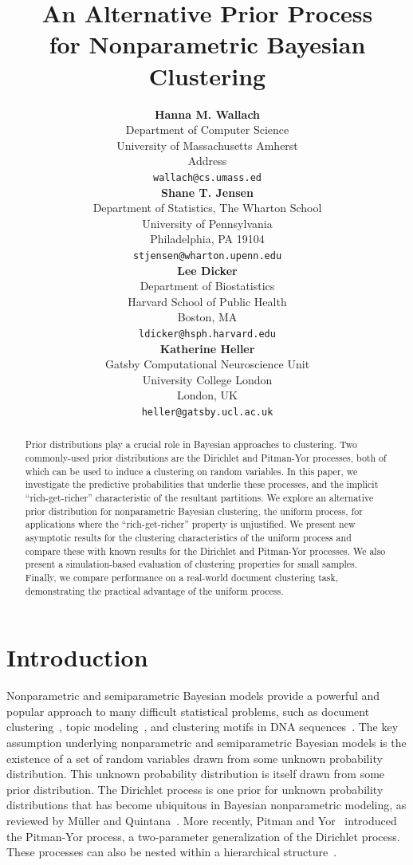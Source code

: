 \documentclass{article}
\title{An Alternative Prior Process\\
for Nonparametric Bayesian Clustering}
\author{
{\bf Hanna M. Wallach}\\
Department of Computer Science \\
University of Massachusetts Amherst \\
Address \\
\texttt{wallach@cs.umass.ed} \\
\And
{\bf Shane T. Jensen}\\
Department of Statistics, The Wharton School\\
University of Pennsylvania\\
Philadelphia, PA 19104 \\
\texttt{stjensen@wharton.upenn.edu} \\
\AND
{\bf Lee Dicker} \\
Department of Biostatistics\\
Harvard School of Public Health\\
Boston, MA \\
\texttt{ldicker@hsph.harvard.edu} \\
\And
{\bf Katherine Heller} \\
Gatsby Computational Neuroscience Unit \\
University College London \\
London, UK \\
\texttt{heller@gatsby.ucl.ac.uk} \\
}
\begin{document}
\makeanontitle

\begin{abstract}
Prior distributions play a crucial role in Bayesian approaches to
clustering.  Two commonly-used prior distributions are the Dirichlet
and Pitman-Yor processes, both of which can be used to induce a
clustering on random variables. In this paper, we investigate the
predictive probabilities that underlie these processes, and the
implicit ``rich-get-richer'' characteristic of the resultant
partitions.  We explore an alternative prior distribution for
nonparametric Bayesian clustering, the uniform process, for
applications where the ``rich-get-richer'' property is unjustified. We present new asymptotic results for the clustering
characteristics of the uniform process and compare these with known
results for the Dirichlet and Pitman-Yor processes. We also present a
simulation-based evaluation of clustering properties for small
samples. Finally, we compare performance on a real-world document
clustering task, demonstrating the practical advantage of the uniform
process.
\end{abstract}

\section{Introduction}
\label{introduction}

Nonparametric and semiparametric Bayesian models provide a powerful
and popular approach to many difficult statistical problems, such as
document clustering~\cite{ZhaGhaYan05}, topic
modeling~\cite{teh06hierarchical}, and clustering motifs in DNA
sequences~\cite{JenLiu08}. The key assumption underlying nonparametric
and semiparametric Bayesian models is the existence of a set of random
variables drawn from some unknown probability distribution. This
unknown probability distribution is itself drawn from some prior
distribution. The Dirichlet process is one prior for unknown
probability distributions that has become ubiquitous in Bayesian
nonparametric modeling, as reviewed by M\"{u}ller and
Quintana~\cite{MulQui04}. More recently, Pitman and
Yor~\cite{PitYor97} introduced the Pitman-Yor process, a two-parameter
generalization of the Dirichlet process. These processes can also be
nested within a hierarchical structure~\cite{TehJorBea06,Teh06}.
\end{document}
